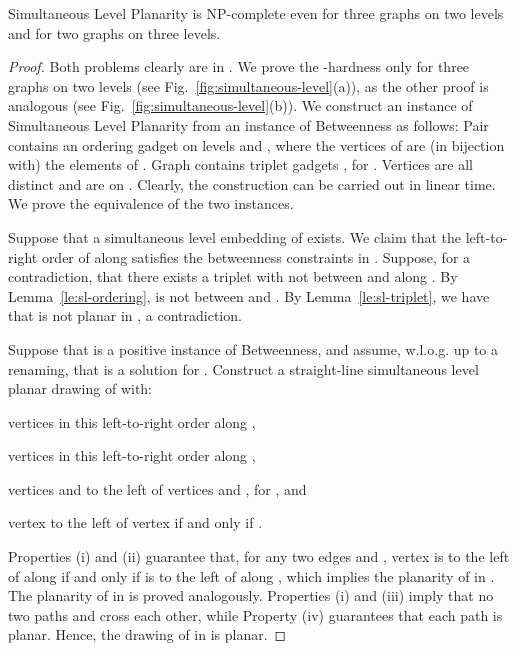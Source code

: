 \documentclass{llncs}
\newcommand{\NP}{\xspace}
\renewcommand{\NP}{}
\newcommand{\NPC}{\mbox{NP-complete}\xspace}
\newcommand{\Gr}[1]{\xspace}
\newcommand{\Gb}[1]{\xspace}
\newcommand{\Gg}[1]{\xspace}
\newcommand{\sefeinstance}[1]{\xspace}
\newcommand{\sefethreeinstance}[1]{\xspace}
\begin{document}
\begin{theorem} \label{thm:sim-level-npc-two-levels} {\sc Simultaneous Level Planarity} is \NPC even for three graphs on two levels and for two graphs on three levels.
\end{theorem}
\begin{proof}
Both problems clearly are in \NP. We prove the \NP-hardness only for three graphs on two levels (see Fig.~\ref{fig:simultaneous-level}(a)), as the other proof is analogous (see Fig.~\ref{fig:simultaneous-level}(b)). We construct an instance  of {\sc Simultaneous Level Planarity} from an instance  of {\sc Betweenness} as follows: Pair \sefeinstance{} contains an ordering gadget on levels  and , where the vertices  of \Gr{} are (in bijection with) the elements of . Graph \Gg{} contains  triplet gadgets , for . Vertices  are all distinct and are on . Clearly, the construction can be carried out in linear time.  We prove the equivalence of the two instances. 


 Suppose that a simultaneous level embedding  of \sefethreeinstance{} exists. We claim that the left-to-right order of  along  satisfies the betweenness constraints in . Suppose, for a contradiction, that there exists a triplet  with  not between  and  along . By Lemma~\ref{le:sl-ordering},  is not between  and . By Lemma~\ref{le:sl-triplet}, we have that  is not planar in  , a contradiction. 

 Suppose that  is a positive instance of {\sc Betweenness}, and assume, w.l.o.g. up to a renaming, that  is a solution for .
Construct a straight-line simultaneous level planar drawing of \sefethreeinstance{} with:
\begin{inparaenum}[(i)]
\item vertices    in this
  left-to-right order along , 
\item  vertices   in this
  left-to-right order along ,
\item  vertices  and  to the left
  of vertices  and , for , and
\item vertex  to the left of vertex  if and only if .
\end{inparaenum}

Properties (i) and (ii) guarantee that, for any two edges  and , vertex  is to the left of  along  if and only if  is to the left of  along , which implies the planarity of \Gr{} in . The planarity of \Gb{} in  is proved analogously. Properties (i) and (iii) imply that no two paths  and  cross each other, while Property (iv) guarantees that each path  is planar. Hence, the drawing of \Gg{} in  is planar.
\end{proof}
\end{document}
